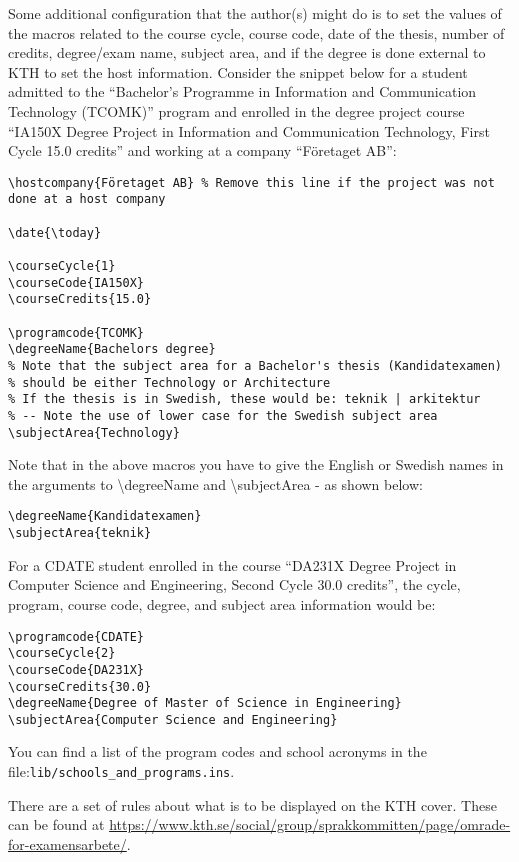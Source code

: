 \documentclass[examplethesis.tex]{subfiles}
\begin{document}
Some additional configuration that the author(s) might do is to set the values of the macros related to the course cycle, course code, date of the thesis, number of credits, degree/exam name, subject area, and if the degree is done external to KTH to set the host information. Consider the snippet below for a student admitted to the ``Bachelor's Programme in Information and Communication Technology (TCOMK)'' program and enrolled in the degree project course ``IA150X Degree Project in Information and Communication Technology, First Cycle 15.0 credits'' and working at a company ``Företaget AB'':
\begin{lstlisting}[style=latexExampleForAuthors]
\hostcompany{Företaget AB} % Remove this line if the project was not done at a host company

\date{\today}

\courseCycle{1}
\courseCode{IA150X}
\courseCredits{15.0}

\programcode{TCOMK}
\degreeName{Bachelors degree}
% Note that the subject area for a Bachelor's thesis (Kandidatexamen)
% should be either Technology or Architecture
% If the thesis is in Swedish, these would be: teknik | arkitektur
% -- Note the use of lower case for the Swedish subject area
\subjectArea{Technology}
\end{lstlisting}

Note that in the above macros you have to give the English or Swedish names in the arguments to \textbackslash degreeName and \textbackslash subjectArea - as shown below:
\begin{lstlisting}[style=latexExampleForAuthors]
\degreeName{Kandidatexamen}
\subjectArea{teknik}
\end{lstlisting}

For a CDATE student enrolled in the course ``DA231X Degree Project in Computer Science and Engineering, Second Cycle 30.0 credits'', the cycle, program, course code, degree, and subject area information would be:
\begin{lstlisting}[style=latexExampleForAuthors]
\programcode{CDATE}
\courseCycle{2}
\courseCode{DA231X}
\courseCredits{30.0}
\degreeName{Degree of Master of Science in Engineering}
\subjectArea{Computer Science and Engineering}
\end{lstlisting}

You can find a list of the program codes and school acronyms in the file:\linebreak[4] \texttt{lib/schools\_and\_programs.ins}.

There are a set of rules about what is to be displayed on the KTH cover. These can be found at \url{https://www.kth.se/social/group/sprakkommitten/page/omrade-for-examensarbete/}.
\end{document}

